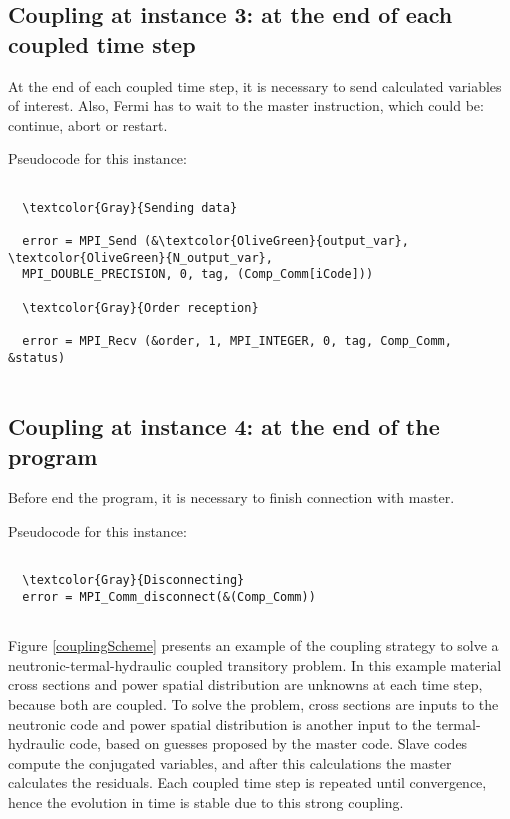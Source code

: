 \subsection*{Coupling at instance 3: at the end of each coupled time step}

At the end of each coupled time step, it is necessary to send calculated variables of interest.
Also, Fermi has to wait to the master instruction, which could be: continue, abort or restart.

Pseudocode for this instance:

\begin{Verbatim}[frame=single,commandchars=\\\{\}]

  \textcolor{Gray}{Sending data}

  error = MPI_Send (&\textcolor{OliveGreen}{output_var}, \textcolor{OliveGreen}{N_output_var}, 
  MPI_DOUBLE_PRECISION, 0, tag, (Comp_Comm[iCode]))
  
  \textcolor{Gray}{Order reception}
  
  error = MPI_Recv (&order, 1, MPI_INTEGER, 0, tag, Comp_Comm, &status)


\end{Verbatim}


\subsection*{Coupling at instance 4: at the end of the program}

Before end the program, it is necessary to finish connection with master.

Pseudocode for this instance:

\begin{Verbatim}[frame=single,commandchars=\\\{\}]

  \textcolor{Gray}{Disconnecting}
  error = MPI_Comm_disconnect(&(Comp_Comm))
  
\end{Verbatim}

Figure \ref{couplingScheme} presents an example of the coupling strategy to solve a neutronic-termal-hydraulic coupled transitory problem.
In this example material cross sections and power spatial distribution are unknowns at each time step, because both are coupled.
To solve the problem, cross sections are inputs to the neutronic code and power spatial distribution is another input to the termal-hydraulic code,
based on guesses proposed by the master code.
Slave codes compute the conjugated variables, and after this calculations the master calculates the residuals.
Each coupled time step is repeated until convergence, hence the evolution in time is stable due to this strong coupling.


